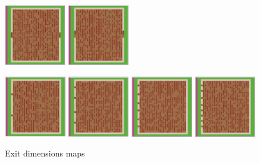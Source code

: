 \documentclass[12pt,letterpaper]{article}
\begin{document}
\begin{figure}[H]
\begin{minipage}[b]{.75\linewidth}
    \includegraphics[width=0.24\textwidth]{./figures/exit_dims_6_b.png}
    \includegraphics[width=0.24\textwidth]{./figures/exit_dims_8_b.png}
  \end{minipage}
  \begin{minipage}[b]{.75\linewidth}
    \includegraphics[width=0.24\textwidth]{./figures/exit_dims_2_c.png}
    \includegraphics[width=0.24\textwidth]{./figures/exit_dims_4_c.png}
    \includegraphics[width=0.24\textwidth]{./figures/exit_dims_6_c.png}
    \includegraphics[width=0.24\textwidth]{./figures/exit_dims_8_c.png}
  \end{minipage}

  \caption{Exit dimensions maps}
  \label{exitdimsmaps}
\end{figure}
\end{document}
